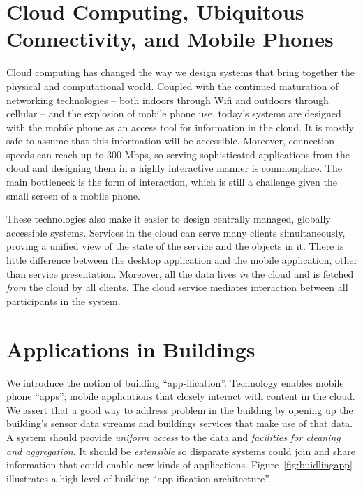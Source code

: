 

\section{Cloud Computing, Ubiquitous Connectivity, and Mobile Phones}
Cloud computing has changed the way we design systems that bring together the physical and computational world.  Coupled with the 
continued maturation of networking technologies -- both indoors through Wifi and outdoors through cellular -- and the explosion of mobile
phone use, today's systems are designed with the mobile phone as an access tool for information in the cloud.  It is mostly safe
to assume that this information will be accessible.  Moreover, connection speeds can reach up to 300 Mbps, so serving sophisticated
applications from the cloud and designing them in a highly interactive manner is commonplace.  The main bottleneck is the form of interaction, which
is still a challenge given the small screen of a mobile phone.

These technologies also make it easier to design centrally managed, globally accessible systems.  %
Services in the cloud
can serve many clients simultaneously, proving a unified view of the state of the service and the objects in it.  There is little difference 
between the desktop application and the mobile application, other than service presentation.  Moreover, all the data lives \emph{in} the cloud 
and is fetched \emph{from} the cloud by all clients.  The cloud service mediates interaction between all
participants in the system.

\section{Applications in Buildings}
We introduce the notion of building ``app-ification''.  Technology enables mobile phone ``apps''; mobile
applications that closely interact with content in the cloud.  We assert that a good way to address problem in the building
by opening up the building's sensor data streams and buildings services that make use of that data.  A system should provide 
\emph{uniform access} to the data and \emph{facilities for cleaning and aggregation}.  It should be \emph{extensible}
so disparate systems could join and share information that could enable new kinds of applications.  Figure~\ref{fig:buidlingapp}
illustrates a high-level of building ``app-ification architecture''.


